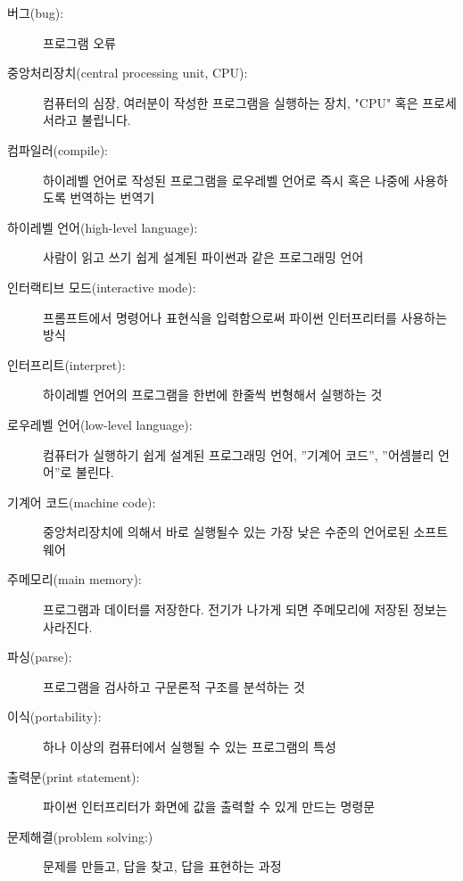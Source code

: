 \begin{description}

\item[버그(bug):]  프로그램 오류

\item[중앙처리장치(central processing unit, CPU):] 컴퓨터의 심장, 여러분이 작성한 프로그램을 실행하는 장치, "CPU" 혹은 프로세서라고 불립니다.

\item[컴파일러(compile):]  하이레벨 언어로 작성된 프로그램을 로우레벨 언어로 즉시 혹은 나중에 사용하도록 번역하는 번역기

\item[하이레벨 언어(high-level language):]  사람이 읽고 쓰기 쉽게 설계된 파이썬과 같은 프로그래밍 언어

\item[인터랙티브 모드(interactive mode):] 프롬프트에서 명령어나 표현식을 입력함으로써 파이썬 인터프리터를 사용하는 방식

\item[인터프리트(interpret):] 하이레벨 언어의 프로그램을 한번에 한줄씩 번형해서 실행하는 것

\item[로우레벨 언어(low-level language):] 컴퓨터가 실행하기 쉽게 설계된 프로그래밍 언어, ''기계어 코드'', ''어셈블리 언어''로 불린다.

\item[기계어 코드(machine code):] 중앙처리장치에 의해서 바로 실행될수 있는 가장 낮은 수준의 언어로된 소프트웨어

\item[주메모리(main memory):] 프로그램과 데이터를 저장한다. 전기가 나가게 되면 주메모리에 저장된 정보는 사라진다.

\item[파싱(parse):]  프로그램을 검사하고 구문론적 구조를 분석하는 것

\item[이식(portability):] 하나 이상의 컴퓨터에서 실행될 수 있는 프로그램의 특성

\item[출력문(print statement):] 파이썬 인터프리터가 화면에 값을 출력할 수 있게 만드는 명령문

\item[문제해결(problem solving:)] 문제를 만들고, 답을 찾고, 답을 표현하는 과정


\end{description}
